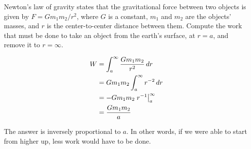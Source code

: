 \begin{eg}
\egquestion Newton's law of gravity states that the gravitational force between two objects
is given by $F=Gm_1m_2/r^2$, where $G$ is a constant, $m_1$ and $m_2$ are the objects' masses,
and $r$ is the center-to-center distance between them. Compute the work that must be done
to take an object from the earth's surface, at $r=a$, and remove it to $r=\infty$.

\eganswer
\begin{align*}
  W &= \int_a^\infty \frac{Gm_1m_2}{r^2} \mathop{d\!} r \\
    &= Gm_1m_2 \int_a^\infty r^{-2} \mathop{d\!} r \\
    &= -Gm_1m_2 \left.r^{-1}\right|_a^\infty  \\
    &= \frac{Gm_1m_2}{a}
\end{align*}

The answer is inversely proportional to $a$. In other words, if we were able to start from
higher up, less work would have to be done.
\end{eg}


